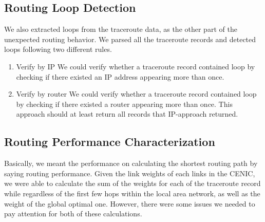 \documentclass[conference, twocolumn, oneside, 10pt]{IEEEtran}
\begin{document}
\subsection{Routing Loop Detection}

We also extracted loops from the traceroute data, as the other part of the unexpected routing behavior. We parsed all the traceroute records and detected loops following two different rules. 
\begin{enumerate}
\item{Verify by IP} We could verify whether a traceroute record contained loop by checking if there existed an IP address appearing more than once. 
\item{Verify by router} We could verify whether a traceroute record contained loop by checking if there existed a router appearing more than once. This approach should at least return all records that IP-approach returned.
\end{enumerate}
\subsection{Routing Performance Characterization}

Basically, we meant the performance on calculating the shortest routing path by saying routing performance. Given the link weights of each links in the CENIC, we were able to calculate the sum of the weights for each of the traceroute record while regardless of the first few hops within the local area network, as well as the weight of the global optimal one. However, there were some issues we needed to pay attention for both of these calculations.
\end{document}

